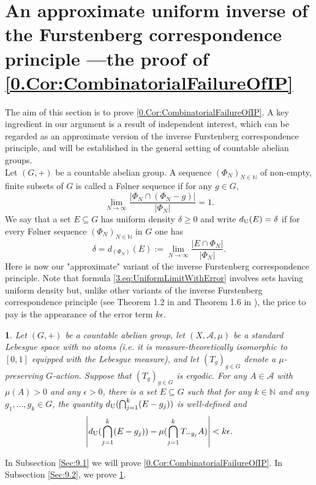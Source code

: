 \documentclass[11pt,american,preprint]{elsarticle}
\numberwithin{equation}{section}
\theoremstyle{plain}
\newtheorem{thm}{\protect\theoremname}[section]
\theoremstyle{plain*}
\theoremstyle{plain}
\theoremstyle{plain*}
\theoremstyle{plain}
\theoremstyle{plain*}
\theoremstyle{remark}
\theoremstyle{remark*}
\theoremstyle{remark}
\theoremstyle{remark*}
\theoremstyle{remark}
\theoremstyle{remark*}
\theoremstyle{plain}
\theoremstyle{definition}
\theoremstyle{plain}
\theoremstyle{plain} %
\providecommand{\theoremname}{Theorem}
\newcommand{\N}{\mathbb{N}}
\begin{document}
\section{An approximate uniform inverse of the Furstenberg correspondence principle ---the proof of \cref{0.Cor:CombinatorialFailureOfIP}}\label{Sec:9}
The aim of this section is to prove \cref{0.Cor:CombinatorialFailureOfIP}. A key ingredient in our argument is a result of independent interest, which can be regarded as an approximate version of the inverse Furstenberg correspondence principle, and will be established in the general setting of countable abelian groups.  \\
Let $(G,+)$ be a countable abelian group. A sequence $(\Phi_N)_{N\in\N}$ of non-empty, finite  subsets  of $G$ is called a F{\o}lner sequence if for any $g\in G$,
$$
\lim_{N\rightarrow\infty}\frac{|\Phi_N\cap(\Phi_N-g)|}{|\Phi_N|}=1.
$$
We say that a  set $E\subseteq G$ has uniform density $\delta\geq 0$  and write $d_{{\rm U}}(E)=\delta$ if for every F{\o}lner sequence $(\Phi_N)_{N\in\N}$ in $G$ one has
 $$\delta=d_{(\Phi_N)}(E):=\lim_{N\rightarrow\infty}\frac{|E\cap \Phi_N|}{|\Phi_N|}.$$
 Here is now  our "approximate" variant of the inverse Furstenberg correspondence principle. Note that formula \eqref{3.eq:UniformLimitWithError} involves sets having uniform density but, unlike other variants of the inverse Furstenberg correspondence principle (see 
  Theorem 1.2 in \cite{SohailRobinVanDerCorputSets} and Theorem 1.6 in \cite{SaulRMInverseFurstenberg}), the price to pay is the appearance of the error term $k\epsilon$. 
\begin{thm}\label{3.Lem:epsilonInverse} Let $(G,+)$ be a countable abelian group, let $(X,\mathcal A,\mu)$  be a standard Lebesgue space with no atoms (i.e. it is measure-theoretically isomorphic to $[0,1]$ equipped with the Lebesgue measure), and let $(T_g)_{g\in G}$ denote a $\mu$-preserving $G$-action. Suppose that $(T_g)_{g\in G}$ is ergodic. For any $A\in\mathcal A$ with $\mu(A)>0$  and any $\epsilon>0$, there is a set $E\subseteq G$ such that for any $k\in\N$ and any  $g_1,...,g_k\in G$, the quantity $d_{{\rm U}}(\bigcap_{j=1}^k(E-g_j))$ is well-defined and 
\begin{equation}\label{3.eq:UniformLimitWithError}
\left|d_{{\rm U}}(\bigcap_{j=1}^k(E-g_j))-\mu(\bigcap_{j=1}^k T_{-g_j}A)\right|<k\epsilon.
\end{equation}
\end{thm}
In Subsection \ref{Sec:9.1} we will prove \cref{0.Cor:CombinatorialFailureOfIP}. In Subsection \ref{Sec:9.2}, we prove 
\cref{3.Lem:epsilonInverse}.
\end{document}
